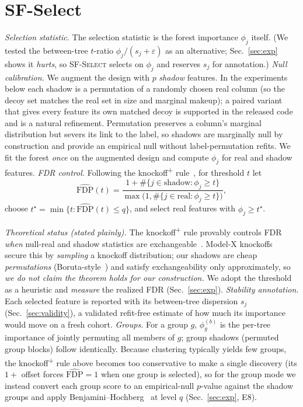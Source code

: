 \documentclass[conference]{IEEEtran}
\begin{document}
\section{SF-Select}\label{sec:method}
\emph{Selection statistic.} The selection statistic is the forest importance
$\phi_j$ itself. (We tested the between-tree $t$-ratio $\phi_j/(s_j+\varepsilon)$
as an alternative; Sec.~\ref{sec:exp} shows it \emph{hurts}, so \textsc{SF-Select}
selects on $\phi_j$ and reserves $s_j$ for annotation.)
\emph{Null calibration.} We augment the design with $p$ \emph{shadow} features.
In the experiments below each shadow is a permutation of a randomly chosen real
column (so the decoy set matches the real set in size and marginal makeup);
a paired variant that gives every feature its own matched decoy is supported in
the released code and is a natural refinement. Permutation preserves a column's
marginal distribution but severs its link to the label, so shadows are
marginally null by construction and provide an empirical null without
label-permutation refits.
We fit the forest \emph{once} on the augmented design and compute $\phi_j$ for
real and shadow features. \emph{FDR control.} Following the
knockoff\textsuperscript{+} rule~\cite{barber2015}, for threshold $t$ let
\begin{equation}
\widehat{\mathrm{FDP}}(t)=\frac{1+\#\{j\in\mathrm{shadow}:\phi_j\ge t\}}
{\max\!\big(1,\#\{j\in\mathrm{real}:\phi_j\ge t\}\big)},
\end{equation}
choose $t^\star=\min\{t:\widehat{\mathrm{FDP}}(t)\le q\}$, and select real
features with $\phi_j\ge t^\star$.

\emph{Theoretical status (stated plainly).} The knockoff\textsuperscript{+}
rule provably controls FDR \emph{when} null-real and shadow statistics are
exchangeable~\cite{barber2015}. Model-X knockoffs~\cite{candes2018} secure this
by \emph{sampling} a knockoff distribution; our shadows are cheap
\emph{permutations} (Boruta-style~\cite{boruta}) and satisfy exchangeability only
approximately, so \emph{we do not claim the theorem holds for our
construction.} We adopt the threshold as a heuristic and \emph{measure} the
realized FDR (Sec.~\ref{sec:exp}). \emph{Stability annotation.} Each selected feature is
reported with its between-tree dispersion $s_j$ (Sec.~\ref{sec:validity}), a
validated refit-free estimate of how much its importance would move on a fresh
cohort. \emph{Groups.} For a group $g$, $\phi_g^{(b)}$ is the per-tree importance
of jointly permuting all members of $g$; group shadows (permuted group blocks)
follow identically. Because clustering typically yields few groups, the
knockoff\textsuperscript{+} rule above becomes too conservative to make a single
discovery (its $1{+}$ offset forces $\widehat{\mathrm{FDP}}{=}1$ when one group is
selected), so for the group mode we instead convert each group score to an
empirical-null $p$-value against the shadow groups and apply
Benjamini--Hochberg~\cite{bh1995} at level $q$ (Sec.~\ref{sec:exp}, E8).
\end{document}

